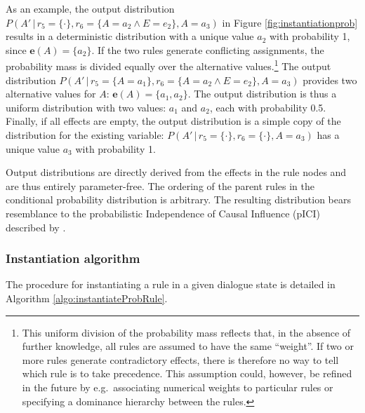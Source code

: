 As an example, the output distribution $P(A' \, | \, r_5\!=\!\{\cdot\},r_6\!=\!\{A\!=\!a_2 \land E\!=\!e_2\}, A\!=\!a_3)$ in Figure \ref{fig:instantiationprob} results in a deterministic distribution with a unique value $a_2$ with probability 1, since $\mathbf{e}(A) = \{a_2\}$. If the two rules generate conflicting assignments, the probability mass is divided equally over the alternative values.\footnote{This uniform division of the probability mass reflects that, in the absence of further knowledge, all rules are assumed to have the same ``weight''. If two or more rules generate contradictory effects, there is therefore no way to tell which rule is to take precedence. This assumption could, however, be refined in the future by e.g.\ associating numerical weights to particular rules or specifying a dominance hierarchy between the rules.}   The output distribution $P(A' \, | \, r_5\!=\!\{A\!=\!a_1\},r_6\!=\!\{A\!=\!a_2 \land E\!=\!e_2\}, A\!=\!a_3)$ provides two alternative values for $A$: $\mathbf{e}(A) = \{a_1,a_2\}$. The output distribution is thus a uniform distribution with two values: $a_1$ and $a_2$, each with probability 0.5. Finally, if all effects are empty, the output distribution is a simple copy of the distribution for the existing variable: $P(A' \, | \, r_5\!=\!\{\cdot\},r_6\!=\!\{\cdot\}, A\!=\!a_3)$ has a unique value $a_3$ with probability 1. 

Output distributions are directly derived from the effects in the rule nodes and are thus entirely parameter-free.  The ordering of the parent rules in the conditional probability distribution is arbitrary. The resulting distribution bears resemblance to the probabilistic Independence of Causal Influence (pICI) described by \cite{diez06}. 


\subsubsection*{Instantiation algorithm} 
\label{sec:utilruleinstantiation}

The procedure for instantiating a rule in a given dialogue state is detailed in Algorithm \ref{algo:instantiateProbRule}. 

